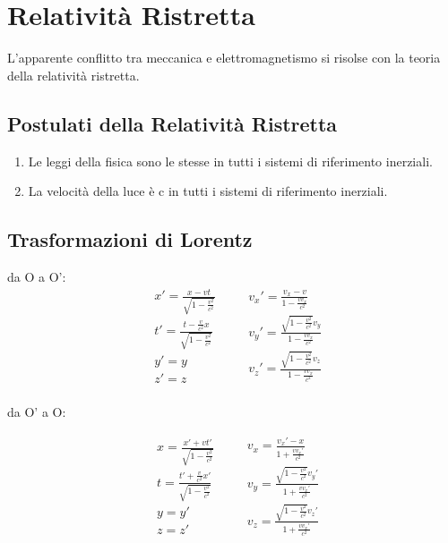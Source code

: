 \documentclass{article}
\begin{document}
\section{Relatività Ristretta}
L'apparente conflitto tra meccanica e elettromagnetismo si risolse con la teoria della relatività ristretta.

\subsection{Postulati della Relatività Ristretta}

\begin{enumerate}
    \item Le leggi della fisica sono le stesse in tutti i sistemi di riferimento inerziali.
    \item La velocità della luce è c in tutti i sistemi di riferimento inerziali.
\end{enumerate}

\subsection{Trasformazioni di Lorentz}
da O a O':
\begin{equation}
\begin{aligned}
   & x'= \frac{x-vt}{\sqrt{1-\frac{v^2}{c^2}}} \\
   & t'= \frac{t-\frac{v}{c^2}x}{\sqrt{1-\frac{v^2}{c^2}}} \\
   & y'=y \\
   & z'=z \\
\end{aligned}
\quad
\begin{aligned}
    & v_x' = \frac{v_x-v}{1-\frac{vv_x}{c^2}} \\
    & v_y' = \frac{\sqrt{1-\frac{v^2}{c^2}}v_y}{1-\frac{vv_x}{c^2}} \\
    & v_z' = \frac{\sqrt{1-\frac{v^2}{c^2}}v_z}{1-\frac{vv_x}{c^2}} \\
 \end{aligned}
\end{equation}

da O' a O:

\begin{equation}
\begin{aligned}
   & x= \frac{x'+vt'}{\sqrt{1-\frac{v^2}{c^2}}} \\
   & t= \frac{t'+\frac{v}{c^2}x'}{\sqrt{1-\frac{v^2}{c^2}}} \\
   & y=y' \\
   & z=z' \\
\end{aligned}
\quad
\begin{aligned}
    & v_x=\frac{v_x'-x}{1+\frac{vv_x'}{c^2}} \\
    & v_y=\frac{\sqrt{1-\frac{v^2}{c^2}}v_y'}{1+\frac{vv_x'}{c^2}} \\
    & v_z=\frac{\sqrt{1-\frac{v^2}{c^2}}v_z'}{1+\frac{vv_x'}{c^2}} \\
\end{aligned}
\end{equation}
\end{document}
